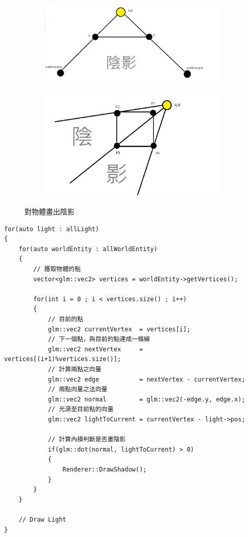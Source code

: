 \begin{figure}[h]
    \begin{subfigure}[b]{0.5\linewidth}
        \includegraphics[width=\textwidth]{./resources/2D-Lighting/DrawShadow.png}
    \end{subfigure}
    \begin{subfigure}[b]{0.5\linewidth}
        \includegraphics[width=\textwidth]{./resources/2D-Lighting/DrawShadow2.png}
    \end{subfigure}
\caption{對物體畫出陰影}
\label{fig:DrawShadow}
\end{figure}

\begin{lstlisting}
for(auto light : allLight)
{
    for(auto worldEntity : allWorldEntity)
    {
        // 獲取物體的點
        vector<glm::vec2> vertices = worldEntity->getVertices();
        
        for(int i = 0 ; i < vertices.size() ; i++)
        {
            // 目前的點
            glm::vec2 currentVertex  = vertices[i];
            // 下一個點，與目前的點連成一條線
            glm::vec2 nextVertex     = vertices[(i+1)%vertices.size()];
            // 計算兩點之向量
            glm::vec2 edge           = nextVertex - currentVertex;
            // 兩點向量之法向量
            glm::vec2 normal         = glm::vec2(-edge.y, edge.x);
            // 光源至目前點的向量
            glm::vec2 lightToCurrent = currentVertex - light->pos;
            
            // 計算內積判斷是否畫陰影
            if(glm::dot(normal, lightToCurrent) > 0)
            {
                Renderer::DrawShadow();
            }
        }
    }
    
    // Draw Light
}
\end{lstlisting}

